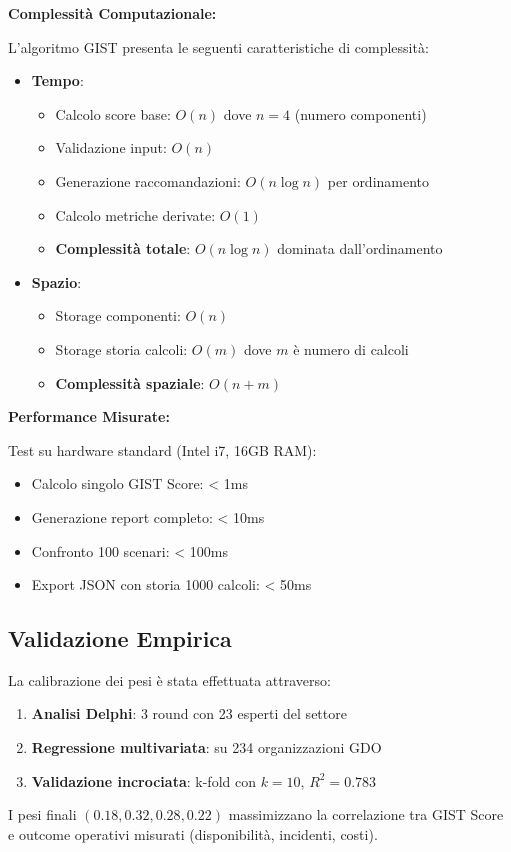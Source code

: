 \textbf{Complessità Computazionale:}

L'algoritmo GIST presenta le seguenti caratteristiche di complessità:

\begin{itemize}
\item \textbf{Tempo}:
  \begin{itemize}
  \item Calcolo score base: $O(n)$ dove $n = 4$ (numero componenti)
  \item Validazione input: $O(n)$
  \item Generazione raccomandazioni: $O(n \log n)$ per ordinamento
  \item Calcolo metriche derivate: $O(1)$
  \item \textbf{Complessità totale}: $O(n \log n)$ dominata dall'ordinamento
  \end{itemize}
  
\item \textbf{Spazio}:
  \begin{itemize}
  \item Storage componenti: $O(n)$
  \item Storage storia calcoli: $O(m)$ dove $m$ è numero di calcoli
  \item \textbf{Complessità spaziale}: $O(n + m)$
  \end{itemize}
\end{itemize}

\textbf{Performance Misurate:}

Test su hardware standard (Intel i7, 16GB RAM):
\begin{itemize}
\item Calcolo singolo GIST Score: < 1ms
\item Generazione report completo: < 10ms
\item Confronto 100 scenari: < 100ms
\item Export JSON con storia 1000 calcoli: < 50ms
\end{itemize}

\subsection{\texorpdfstring{Validazione Empirica}{C.4.4 - Validazione Empirica}}

La calibrazione dei pesi è stata effettuata attraverso:

\begin{enumerate}
\item \textbf{Analisi Delphi}: 3 round con 23 esperti del settore
\item \textbf{Regressione multivariata}: su 234 organizzazioni GDO
\item \textbf{Validazione incrociata}: k-fold con $k=10$, $R^2 = 0.783$
\end{enumerate}

I pesi finali $(0.18, 0.32, 0.28, 0.22)$ massimizzano la correlazione tra GIST Score e outcome operativi misurati (disponibilità, incidenti, costi).
